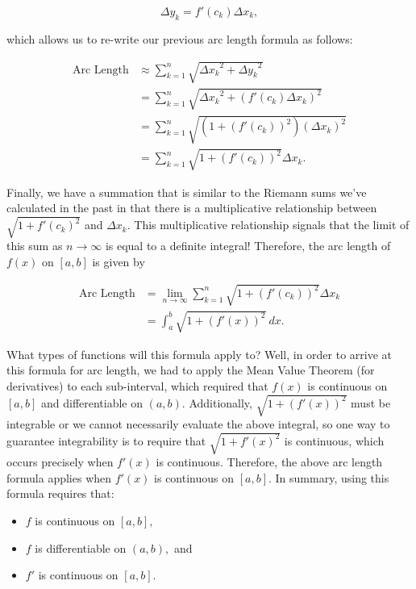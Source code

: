 \documentclass[handout,nooutcomes]{ximera}
\begin{document}
$$\Delta y_k = f'(c_k) \Delta x_k,$$

which allows us to re-write our previous arc length formula as follows:

\begin{align*}
\text{Arc Length} &\approx \displaystyle\sum_{k=1}^n \sqrt{{{\Delta x}_k}^2+{{\Delta y}_k}^2} \\
&= \displaystyle\sum_{k=1}^n \sqrt{{{\Delta x}_k}^2 + (f'(c_k) \Delta x_k)^2} \\
&= \displaystyle\sum_{k=1}^n \sqrt{(1+(f'(c_k))^2)(\Delta x _k)^2} \\
&= \displaystyle\sum_{k=1}^n \sqrt{1+(f'(c_k))^2} \Delta x _k.
\end{align*}

Finally, we have a summation that is similar to the Riemann sums we've calculated in the past in that there is a multiplicative relationship between $\sqrt{1+{f'(c_k)}^2}$ and $\Delta x _k$.  This multiplicative relationship signals that the limit of this sum as $n \to \infty$ is equal to a definite integral!  Therefore, the arc length of $f(x)$ on $[a,b]$ is given by

\begin{align*}
\text{Arc Length} &= \displaystyle\lim_{n \to \infty} \displaystyle\sum_{k=1}^n \sqrt{1+(f'(c_k))^2} \Delta x _k \\ 
&= \displaystyle\int_{a}^{b} \sqrt{1+(f'(x))^2} \ dx .
\end{align*}

What types of functions will this formula apply to?  Well, in order to arrive at this formula for arc length, we had to apply the Mean Value Theorem (for derivatives) to each sub-interval, which required that $f(x)$ is continuous on $[a,b]$ and differentiable on $(a,b).$  Additionally, $\sqrt{1+(f'(x))^2}$ must be integrable or we cannot necessarily evaluate the above integral, so one way to guarantee integrability is to require that $\sqrt{1+{f'(x)}^2}$ is continuous, which occurs precisely when $f'(x)$ is continuous.  Therefore, the above arc length formula applies when $f'(x)$ is continuous on $[a,b]$.  In summary, using this formula requires that: 

\begin{itemize}

\item $f$ is continuous on $[a,b],$
\item $f$ is differentiable on $(a,b),$ and
\item $f'$ is continuous on $[a,b]$.

\end{itemize}
\end{document}
